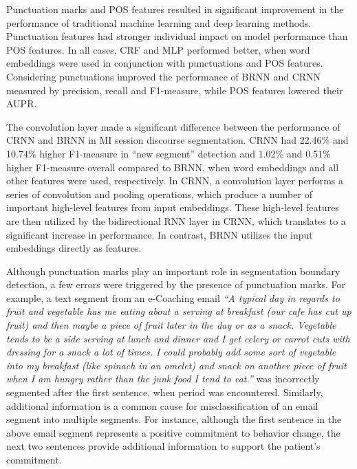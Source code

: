 \documentclass{amia}
\begin{document}
Punctuation marks and POS features resulted in significant improvement in the performance of traditional machine learning and deep learning methods. Punctuation features had stronger individual impact on model performance than POS features. In all cases, CRF and MLP performed better, when word embeddings were used in conjunction with punctuations and POS features. Considering punctuations improved the performance of BRNN and CRNN measured by precision, recall and F1-measure, while POS features lowered their AUPR. %

The convolution layer made a significant difference between the performance of CRNN and BRNN in MI session discourse segmentation. CRNN had 22.46\% and 10.74\% higher F1-measure in ``new segment'' detection and 1.02\% and 0.51\% higher F1-measure overall compared to BRNN, when word embeddings and all other features were used, respectively. In CRNN, a convolution layer performs a series of convolution and pooling operations, which produce a number of important high-level features from input embeddings. These high-level features are then utilized by the bidirectional RNN layer in CRNN, which translates to a significant increase in performance. In contrast, BRNN utilizes the input embeddings directly as features.     

Although punctuation marks play an important role in segmentation boundary detection, a few errors were triggered by the presence of punctuation marks. For example, a text segment from an e-Coaching email \textit{``A typical day in regards to fruit and vegetable has me eating about a serving at breakfast (our cafe has cut up fruit) and then maybe a piece of fruit later in the day or as a snack. Vegetable tends to be a side serving at lunch and dinner and I get celery or carrot cuts with dressing for a snack a lot of times. I could probably add some sort of vegetable into my breakfast (like spinach in an omelet) and snack on another piece of fruit when I am hungry rather than the junk food I tend to eat.''} was incorrectly segmented after the first sentence, when period was encountered. Similarly, additional information is a common cause for misclassification of an email segment into multiple segments. For instance, although the first sentence in the above email segment represents a positive commitment to behavior change, the next two sentences provide additional information to support the patient's commitment. 
\end{document}
